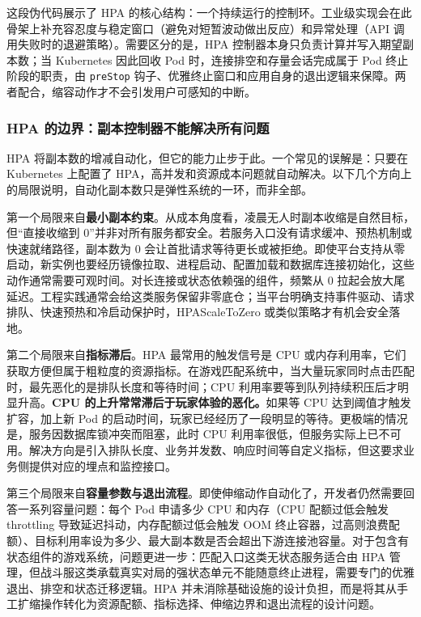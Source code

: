 这段伪代码展示了 HPA 的核心结构：一个持续运行的控制环。工业级实现会在此骨架上补充容忍度与稳定窗口（避免对短暂波动做出反应）和异常处理（API 调用失败时的退避策略）。需要区分的是，HPA 控制器本身只负责计算并写入期望副本数；当 Kubernetes 因此回收 Pod 时，连接排空和存量会话完成属于 Pod 终止阶段的职责，由 \texttt{preStop} 钩子、优雅终止窗口和应用自身的退出逻辑来保障。两者配合，缩容动作才不会引发用户可感知的中断。

\subsubsection{HPA 的边界：副本控制器不能解决所有问题}

HPA 将副本数的增减自动化，但它的能力止步于此。一个常见的误解是：只要在 Kubernetes 上配置了 HPA，高并发和资源成本问题就自动解决。以下几个方向上的局限说明，自动化副本数只是弹性系统的一环，而非全部。

第一个局限来自\textbf{最小副本约束}。从成本角度看，凌晨无人时副本收缩是自然目标，但“直接收缩到 0”并非对所有服务都安全。若服务入口没有请求缓冲、预热机制或快速就绪路径，副本数为 0 会让首批请求等待更长或被拒绝。即使平台支持从零启动，新实例也要经历镜像拉取、进程启动、配置加载和数据库连接初始化，这些动作通常需要可观时间。对长连接或状态依赖强的组件，频繁从 0 拉起会放大尾延迟。工程实践通常会给这类服务保留非零底仓；当平台明确支持事件驱动、请求排队、快速预热和冷启动保护时，HPAScaleToZero 或类似策略才有机会安全落地。

第二个局限来自\textbf{指标滞后}。HPA 最常用的触发信号是 CPU 或内存利用率，它们获取方便但属于粗粒度的资源指标。在游戏匹配系统中，当大量玩家同时点击匹配时，最先恶化的是排队长度和等待时间；CPU 利用率要等到队列持续积压后才明显升高。\textbf{CPU 的上升常常滞后于玩家体验的恶化。}如果等 CPU 达到阈值才触发扩容，加上新 Pod 的启动时间，玩家已经经历了一段明显的等待。更极端的情况是，服务因数据库锁冲突而阻塞，此时 CPU 利用率很低，但服务实际上已不可用。解决方向是引入排队长度、业务并发数、响应时间等自定义指标，但这要求业务侧提供对应的埋点和监控接口。

第三个局限来自\textbf{容量参数与退出流程}。即使伸缩动作自动化了，开发者仍然需要回答一系列容量问题：每个 Pod 申请多少 CPU 和内存（CPU 配额过低会触发 throttling 导致延迟抖动，内存配额过低会触发 OOM 终止容器，过高则浪费配额）、目标利用率设为多少、最大副本数是否会超出下游连接池容量。对于包含有状态组件的游戏系统，问题更进一步：匹配入口这类无状态服务适合由 HPA 管理，但战斗服这类承载真实对局的强状态单元不能随意终止进程，需要专门的优雅退出、排空和状态迁移逻辑。HPA 并未消除基础设施的设计负担，而是将其从手工扩缩操作转化为资源配额、指标选择、伸缩边界和退出流程的设计问题。

